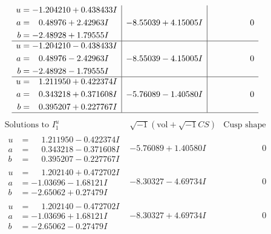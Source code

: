 \documentclass[1p]{elsarticle_modified}
\theoremstyle{definition}
\newcommand{\I}{\sqrt{-1}}
\begin{document}
$$\begin{array}{c|c|c}
\begin{aligned}
u &= -1.204210 + 0.438433 I \\
a &= \phantom{-}0.48976 + 2.42963 I \\
b &= -2.48928 + 1.79555 I\end{aligned}
 & -8.55039 + 4.15005 I & \phantom{-0.000000 } 0 \\ \hline\begin{aligned}
u &= -1.204210 - 0.438433 I \\
a &= \phantom{-}0.48976 - 2.42963 I \\
b &= -2.48928 - 1.79555 I\end{aligned}
 & -8.55039 - 4.15005 I & \phantom{-0.000000 } 0 \\ \hline\begin{aligned}
u &= \phantom{-}1.211950 + 0.422374 I \\
a &= \phantom{-}0.343218 + 0.371608 I \\
b &= \phantom{-}0.395207 + 0.227767 I\end{aligned}
 & -5.76089 - 1.40580 I & \phantom{-0.000000 } 0\\
 \hline 
 \end{array}$$\newpage$$\begin{array}{c|c|c}  
\text{Solutions to }I^u_{1}& \I (\text{vol} + \sqrt{-1}CS) & \text{Cusp shape}\\
 \hline 
\begin{aligned}
u &= \phantom{-}1.211950 - 0.422374 I \\
a &= \phantom{-}0.343218 - 0.371608 I \\
b &= \phantom{-}0.395207 - 0.227767 I\end{aligned}
 & -5.76089 + 1.40580 I & \phantom{-0.000000 } 0 \\ \hline\begin{aligned}
u &= \phantom{-}1.202140 + 0.472702 I \\
a &= -1.03696 - 1.68121 I \\
b &= -2.65062 + 0.27479 I\end{aligned}
 & -8.30327 - 4.69734 I & \phantom{-0.000000 } 0 \\ \hline\begin{aligned}
u &= \phantom{-}1.202140 - 0.472702 I \\
a &= -1.03696 + 1.68121 I \\
b &= -2.65062 - 0.27479 I\end{aligned}
 & -8.30327 + 4.69734 I & \phantom{-0.000000 } 0 \\ \hline\begin{aligned}

\end{aligned}
\end{array}$$
\end{document}
